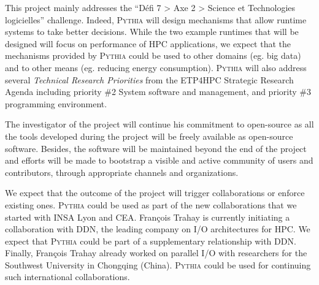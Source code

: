 \documentclass[a4paper,11pt,defblank]{article}
\newcommand{\todo}[1]{\mynote{TODO}{#1}}
\newcommand{\pname}{\textsc{Pythia}\xspace}
\begin{document}
This project mainly addresses the ``Défi 7 > Axe 2 > Science et
Technologies logicielles'' challenge. Indeed, \pname will design
mechanisms that allow runtime systems to take better decisions. While
the two example runtimes that will be designed will focus on
performance of HPC applications, we expect that the mechanisms
provided by \pname could be used to other domains (eg. big data) and
to other means (eg. reducing energy consumption).
%
\pname will also address several \emph{Technical Research Priorities}
from the ETP4HPC Strategic Research Agenda \cite{etp4hpc} including priority
\#2 System software and management, and priority \#3 programming
environment.

% 


The investigator of the project will continue his commitment to
open-source as all the tools developed during the
project will be freely available as open-source software.
%
Besides, the software will be maintained beyond the end of
the project and efforts will be made to bootstrap a visible and
active community of users and contributors, through appropriate
channels and organizations.

We expect that the outcome of the project will trigger collaborations
or enforce existing ones. \pname could be used as part of the new
collaborations that we started with INSA Lyon and CEA. François
Trahay is currently initiating a collaboration with DDN, the leading
company on I/O architectures for HPC. We expect that \pname could be
part of a supplementary relationship with DDN. Finally, François
Trahay already worked on parallel I/O \cite{prefetch_liao} with
researchers for the Southwest University in Chongqing (China). \pname
could be used for continuing such international collaborations.
\end{document}
